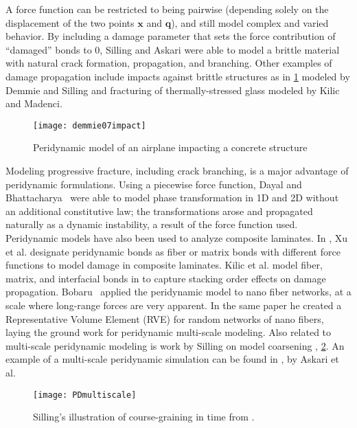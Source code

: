 A force function can be restricted to being pairwise (depending solely on the displacement of the two points \(\mathbf{x}\) and \(\mathbf{q}\)), and still model complex and varied behavior.
By including a damage parameter that sets the force contribution of ``damaged'' bonds to \(0\), Silling and Askari\cite{silling2005meshfree} were able to model a brittle material with natural crack formation, propagation, and branching.
Other examples of damage propagation include impacts against brittle structures as in \cref{fig:PDimpact} modeled by Demmie and Silling\cite{demmie2007approach} and fracturing of thermally-stressed glass modeled by Kilic and Madenci\cite{kilic2009prediction}. 
%
\begin{figure}[h]
  \centering
\texttt{[image: demmie07impact]}
\caption[Peridynamic model of an airplane impacting a concrete structure]{Peridynamic model of an airplane impacting a concrete structure \cite{demmie2007approach} }
\label{fig:PDimpact}
\end{figure}
%
Modeling progressive fracture, including crack branching, is a major advantage of peridynamic formulations.
Using a piecewise force function, Dayal and Bhattacharya~\cite{dayal2006kinetics} were able to model phase transformation in 1D and 2D without an additional constitutive law; the transformations arose and propagated naturally as a dynamic instability, a result of the force function used.
Peridynamic models have also been used to analyze composite laminates.
In \cite{xu2008peridynamic}, Xu et al. designate peridynamic bonds as fiber or matrix bonds with different force functions to model damage in composite laminates. 
Kilic et al. model fiber, matrix, and interfacial bonds in \cite{kilic2009peridynamic} to capture stacking order effects on damage propagation.
Bobaru~\cite{bobaru2007influence} applied the peridynamic model to nano fiber networks, at a scale where long-range forces are very apparent.
In the same paper he created a Representative Volume Element (RVE) for random networks of nano fibers, laying the ground work for peridynamic multi-scale modeling.
Also related to multi-scale peridynamic modeling is work by Silling on model coarsening \cite{silling2011coarsening}, \cref{fig:PDmultiscale}.
An example of a multi-scale peridynamic simulation can be found in \cite{askari2008peridynamics}, by Askari et al.
%
\begin{figure}[h]
  \centering
\texttt{[image: PDmultiscale]}
\caption[Silling's illustration of course-graining in time]{Silling's illustration of course-graining in time from \cite{silling2011coarsening}.}
\label{fig:PDmultiscale}
\end{figure}
%

